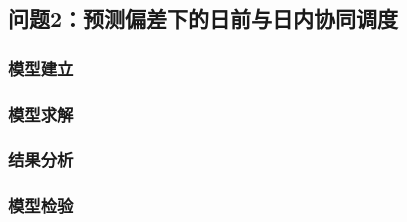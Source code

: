 \subsection{问题2：预测偏差下的日前与日内协同调度}
\subsubsection{模型建立}

\subsubsection{模型求解}

\subsubsection{结果分析}

\subsubsection{模型检验}

